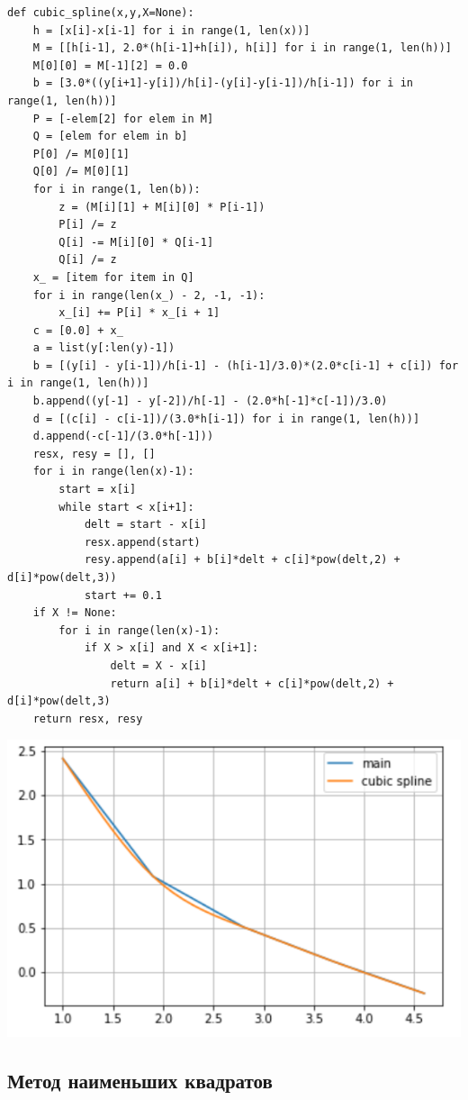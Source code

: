 \documentclass[pdf, unicode, 12pt, a4paper,oneside,fleqn]{article}
\begin{document}
\begin{lstlisting}
def cubic_spline(x,y,X=None):
    h = [x[i]-x[i-1] for i in range(1, len(x))]
    M = [[h[i-1], 2.0*(h[i-1]+h[i]), h[i]] for i in range(1, len(h))]
    M[0][0] = M[-1][2] = 0.0
    b = [3.0*((y[i+1]-y[i])/h[i]-(y[i]-y[i-1])/h[i-1]) for i in range(1, len(h))]
    P = [-elem[2] for elem in M]
    Q = [elem for elem in b]
    P[0] /= M[0][1]
    Q[0] /= M[0][1]
    for i in range(1, len(b)):
        z = (M[i][1] + M[i][0] * P[i-1])
        P[i] /= z
        Q[i] -= M[i][0] * Q[i-1]
        Q[i] /= z
    x_ = [item for item in Q]
    for i in range(len(x_) - 2, -1, -1):
        x_[i] += P[i] * x_[i + 1]
    c = [0.0] + x_
    a = list(y[:len(y)-1])
    b = [(y[i] - y[i-1])/h[i-1] - (h[i-1]/3.0)*(2.0*c[i-1] + c[i]) for i in range(1, len(h))]
    b.append((y[-1] - y[-2])/h[-1] - (2.0*h[-1]*c[-1])/3.0)
    d = [(c[i] - c[i-1])/(3.0*h[i-1]) for i in range(1, len(h))]
    d.append(-c[-1]/(3.0*h[-1]))
    resx, resy = [], []
    for i in range(len(x)-1):
        start = x[i]
        while start < x[i+1]:
            delt = start - x[i]
            resx.append(start)
            resy.append(a[i] + b[i]*delt + c[i]*pow(delt,2) + d[i]*pow(delt,3))
            start += 0.1
    if X != None:
        for i in range(len(x)-1):
            if X > x[i] and X < x[i+1]:
                delt = X - x[i]
                return a[i] + b[i]*delt + c[i]*pow(delt,2) + d[i]*pow(delt,3)
    return resx, resy
\end{lstlisting}

\includegraphics[scale=0.5]{data2.png}

\subsection{Метод наименьших квадратов}
\end{document}
